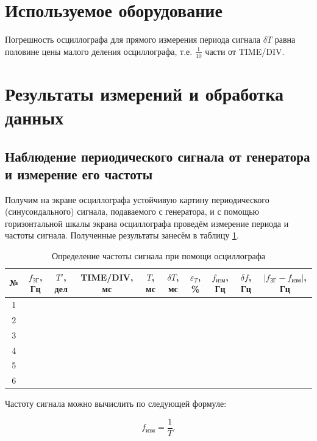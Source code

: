 \documentclass[a4paper,12pt]{article} %
\begin{document}
	\section{Используемое оборудование}
	Погрешность осциллографа для прямого измерения периода сигнала $ \delta T $ равна половине цены малого деления осциллографа, т.е. $ \frac{1}{10} $ части от TIME/DIV.

	\section{Результаты измерений и обработка данных}
	
	\subsection{Наблюдение периодического сигнала от генератора и измерение его частоты}
	
	Получим на экране осциллографа устойчивую картину периодического (синусоидального) сигнала, подаваемого с генератора, и с помощью горизонтальной шкалы экрана осциллографа проведём измерение периода и частоты сигнала. Полученные результаты занесём в таблицу \ref{tab:chastota}.
	
	\begin{table}[H]
		\centering
		\begin{tabular}{|c|c|c|c|c|c|c|c|c|c|}
			\hline
			№ & $ f_\text{ЗГ} $, Гц & $ T' $, дел & TIME/DIV, мс & $ T $, мс & $ \delta T $, мс & $ \varepsilon_T $, \% & $ f_\text{изм} $, Гц & $ \delta f $, Гц & $ \left| f_\text{ЗГ} - f_\text{изм} \right| $, Гц \\ \hline
			1 &  &  &  &  &  &  &  &  &  \\ \hline
			2 &  &  &  &  &  &  &  &  &  \\ \hline
			3 &  &  &  &  &  &  &  &  &  \\ \hline
			4 &  &  &  &  &  &  &  &  &  \\ \hline
			5 &  &  &  &  &  &  &  &  &  \\ \hline
			6 &  &  &  &  &  &  &  &  &  \\ \hline
		\end{tabular}
		\caption{Определение частоты сигнала при помощи осциллографа}
		\label{tab:chastota}
	\end{table}
	
	
	Частоту сигнала можно вычислить по следующей формуле:
	
	\begin{equation}
		f_\text{изм} = \frac{1}{T}.
	\end{equation}
	
\end{document}
